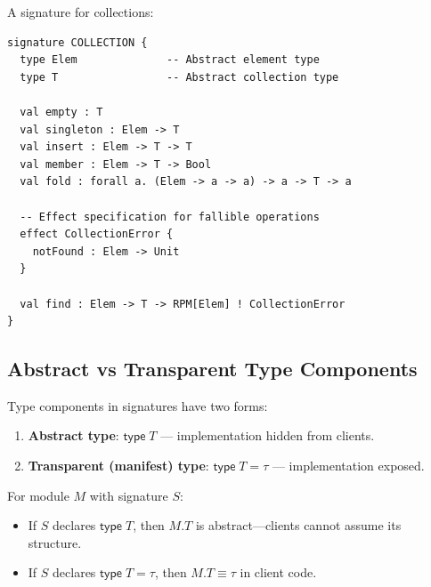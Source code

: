 \begin{example}
\label{ex:signature-decl}
A signature for collections:
\begin{verbatim}
signature COLLECTION {
  type Elem              -- Abstract element type
  type T                 -- Abstract collection type

  val empty : T
  val singleton : Elem -> T
  val insert : Elem -> T -> T
  val member : Elem -> T -> Bool
  val fold : forall a. (Elem -> a -> a) -> a -> T -> a

  -- Effect specification for fallible operations
  effect CollectionError {
    notFound : Elem -> Unit
  }

  val find : Elem -> T -> RPM[Elem] ! CollectionError
}
\end{verbatim}
\end{example}

\subsection{Abstract vs Transparent Type Components}
\label{subsec:abstract-transparent}

\begin{definition}
\label{def:type-visibility}
Type components in signatures have two forms:
\begin{enumerate}
  \item \textbf{Abstract type}: $\mathsf{type}\; T$ --- implementation hidden from clients.
  \item \textbf{Transparent (manifest) type}: $\mathsf{type}\; T = \tau$ --- implementation exposed.
\end{enumerate}
\end{definition}

\begin{definition}
\label{def:type-abstraction-typing}
For module $M$ with signature $S$:
\begin{itemize}
  \item If $S$ declares $\mathsf{type}\; T$, then $M.T$ is abstract---clients cannot assume its structure.
  \item If $S$ declares $\mathsf{type}\; T = \tau$, then $M.T \equiv \tau$ in client code.
\end{itemize}
\end{definition}

